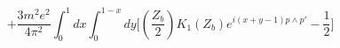 \begin{equation}
+\frac{3m^{2}e^{2}}{4\pi^{2}}\int_{0}^{1}dx\int_{0}^{1-x}dy
\biggl[\left(\frac{Z_{b}}{2}\right)K_{1}(Z_{b})e^{i(x+y-1)p\wedge
p'}-\frac{1}{2}\biggr]
\end{equation}

